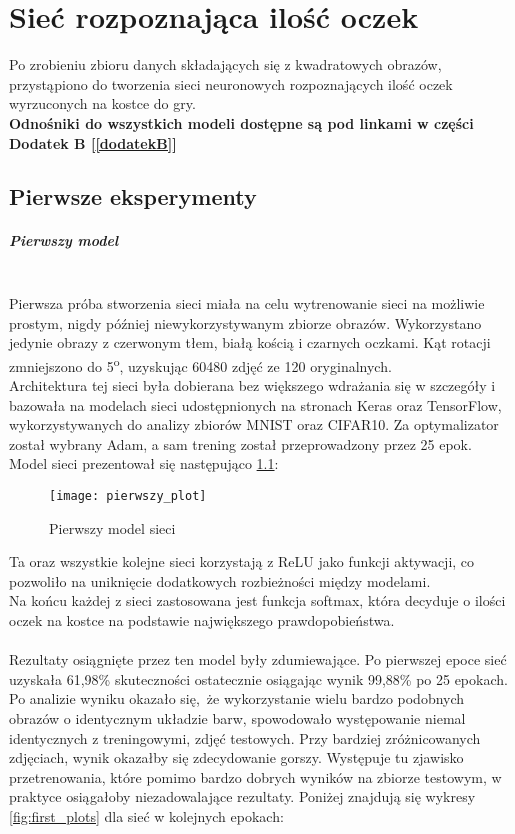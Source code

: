 
\chapter{Sieć rozpoznająca ilość oczek}
Po zrobieniu zbioru danych składających się z kwadratowych obrazów, przystąpiono
do tworzenia sieci neuronowych rozpoznających ilość oczek wyrzuconych na kostce do gry.\\
\textbf{Odnośniki do wszystkich modeli dostępne są pod linkami w części Dodatek B [\ref{dodatekB}] }

\section{Pierwsze eksperymenty}
\paragraph{Pierwszy model} \mbox{}\\
Pierwsza próba stworzenia sieci miała
na celu wytrenowanie sieci na możliwie prostym, nigdy później niewykorzystywanym zbiorze obrazów.
Wykorzystano jedynie obrazy z czerwonym tłem, białą kością i czarnych oczkami.
Kąt rotacji zmniejszono do 5\textsuperscript{o}, uzyskując 60480 zdjęć ze 120 oryginalnych.\\
Architektura tej sieci była dobierana bez większego wdrażania się w szczegóły i
bazowała na modelach sieci udostępnionych na stronach Keras oraz TensorFlow,
wykorzystywanych do analizy zbiorów MNIST oraz CIFAR10. Za optymalizator został wybrany
Adam, a sam trening został przeprowadzony przez 25 epok.
Model sieci prezentował się następująco \ref{fig:first_model}: \newpage
\begin{figure}[h!]
\centering
\texttt{[image: pierwszy\_plot]}
\caption{Pierwszy model sieci}
\label{fig:first_model}
\end{figure}
Ta oraz wszystkie kolejne sieci korzystają z ReLU jako funkcji aktywacji,
co pozwoliło na uniknięcie dodatkowych rozbieżności między modelami.\\
Na końcu każdej z sieci zastosowana jest funkcja softmax, która decyduje o ilości oczek
na kostce na podstawie największego prawdopobieństwa.\\\\
Rezultaty osiągnięte przez ten model były zdumiewające. Po pierwszej epoce
sieć uzyskała 61,98\% skuteczności ostatecznie osiągając wynik 99,88\% po 25 epokach.\\
Po analizie wyniku okazało się, że wykorzystanie wielu bardzo podobnych obrazów o identycznym
układzie barw, spowodowało występowanie niemal identycznych z treningowymi, zdjęć testowych.
Przy bardziej zróżnicowanych zdjęciach, wynik okazałby się zdecydowanie gorszy.
Występuje tu zjawisko przetrenowania, które pomimo bardzo dobrych wyników na zbiorze testowym,
w praktyce osiągałoby niezadowalające rezultaty. Poniżej znajdują się wykresy \ref{fig:first_plots}
dla sieć w kolejnych epokach:

